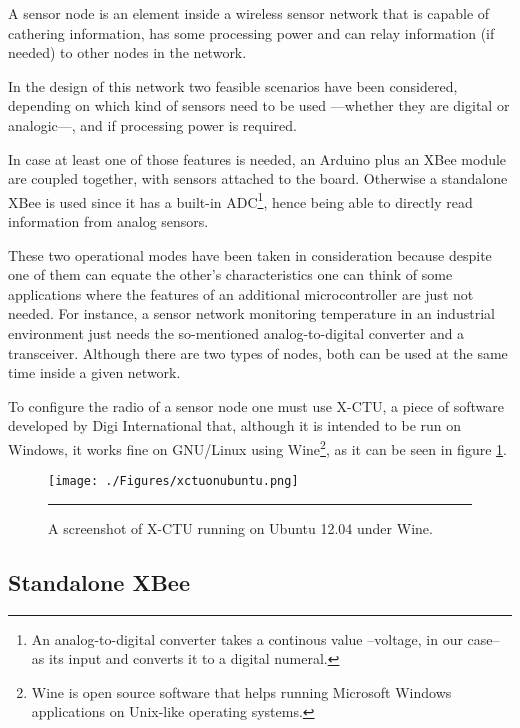 A sensor node is an element inside a wireless sensor network that is capable of cathering information, has some processing power and can relay information (if needed) to other nodes in the network\citep{chong2003sensor}.

In the design of this network two feasible scenarios have been considered, depending on which kind of sensors need to be used ---whether they are digital or analogic---, and if processing power is required.

In case at least one of those features is needed, an Arduino plus an XBee\textregistered{} module are coupled together, with sensors attached to the board. Otherwise a standalone XBee\textregistered{} is used since it has a built-in ADC\footnote{An analog-to-digital converter takes a continous value --voltage, in our case-- as its input and converts it to a digital numeral.}, hence being able to directly read information from analog sensors.

These two operational modes have been taken in consideration because despite one of them can equate the other's characteristics one can think of some applications where the features of an additional microcontroller are just not needed. For instance, a sensor network monitoring temperature in an industrial environment just needs the so-mentioned analog-to-digital converter and a transceiver. Although there are two types of nodes, both can be used at the same time inside a given network.

To configure the radio of a sensor node one must use X-CTU, a piece of software developed by Digi International that, although it is intended to be run on Windows, it works fine on GNU/Linux using Wine\footnote{Wine is open source software that helps running Microsoft Windows applications on Unix-like operating systems.}, as it can be seen in figure \ref{fig:xctuonubuntu}.

\begin{figure}[htbp]
    \centering
        \texttt{[image: ./Figures/xctuonubuntu.png]}
        \rule{35em}{0.5pt}
        \caption[Screenshot of X-CTU]{A screenshot of X-CTU running on Ubuntu 12.04 under Wine.}
    \label{fig:xctuonubuntu}
\end{figure}

\subsection{Standalone XBee}

